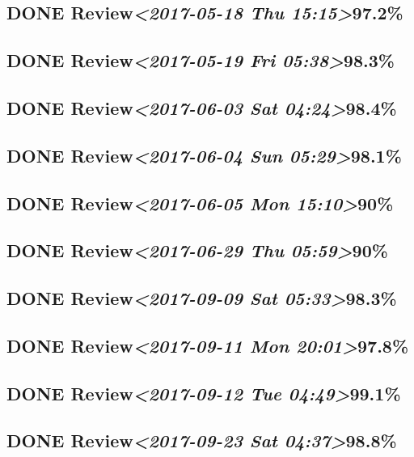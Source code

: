 \documentclass[11pt]{ctexart}
\begin{document}
\subsection{{\bfseries\sffamily DONE} Review\textit{<2017-05-18 Thu 15:15>}97.2\%}
\label{sec:org85d7d22}
\subsection{{\bfseries\sffamily DONE} Review\textit{<2017-05-19 Fri 05:38>}98.3\%}
\label{sec:org9e53ebb}
\subsection{{\bfseries\sffamily DONE} Review\textit{<2017-06-03 Sat 04:24>}98.4\%}
\label{sec:org1f75ba1}
\subsection{{\bfseries\sffamily DONE} Review\textit{<2017-06-04 Sun 05:29>}98.1\%}
\label{sec:org50b2150}
\subsection{{\bfseries\sffamily DONE} Review\textit{<2017-06-05 Mon 15:10>}90\%}
\label{sec:org0d7e6aa}
\subsection{{\bfseries\sffamily DONE} Review\textit{<2017-06-29 Thu 05:59>}90\%}
\label{sec:orgbebade1}
\subsection{{\bfseries\sffamily DONE} Review\textit{<2017-09-09 Sat 05:33>}98.3\%}
\label{sec:orgf9ad891}
\subsection{{\bfseries\sffamily DONE} Review\textit{<2017-09-11 Mon 20:01>}97.8\%}
\label{sec:org1d219bc}
\subsection{{\bfseries\sffamily DONE} Review\textit{<2017-09-12 Tue 04:49>}99.1\%}
\label{sec:orge453f63}
\subsection{{\bfseries\sffamily DONE} Review\textit{<2017-09-23 Sat 04:37>}98.8\%}
\label{sec:org7526838}
\end{document}
